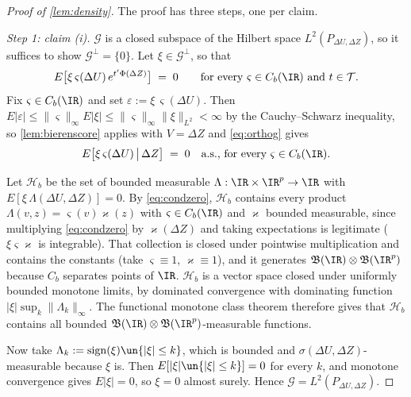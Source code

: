 \begin{proof}[Proof of \cref{lem:density}]
The proof has three steps, one per claim.

\emph{Step 1: claim (i).}
$\mathcal G$ is a closed subspace of the Hilbert space $L^{2}(P_{\Delta U,\Delta Z})$, so it suffices to
show $\mathcal G^{\perp}=\{0\}$. Let $\xi\in\mathcal G^{\perp}$, so that
\begin{equation}\label{eq:orthog}
E\big[\xi\,\varsigma(\Delta U)\,e^{t'\Phi(\Delta Z)}\big]\;=\;0
\qquad\text{for every }\varsigma\in C_b(\IR)\text{ and }t\in\mathcal T .
\end{equation}
Fix $\varsigma\in C_b(\IR)$ and set $\varepsilon:=\xi\,\varsigma(\Delta U)$. Then
$E|\varepsilon|\le\|\varsigma\|_\infty E|\xi|\le\|\varsigma\|_\infty\|\xi\|_{L^{2}}<\infty$ by the
Cauchy--Schwarz inequality, so \cref{lem:bierenscore} applies with $V=\Delta Z$ and \eqref{eq:orthog}
gives
\begin{equation}\label{eq:condzero}
E\big[\xi\,\varsigma(\Delta U)\,\big|\,\Delta Z\big]\;=\;0\quad\text{a.s., for every }\varsigma\in C_b(\IR).
\end{equation}

Let $\mathcal H_b$ be the set of bounded measurable $\Lambda:\IR\times\IR^{p}\to\IR$ with
$E[\xi\,\Lambda(\Delta U,\Delta Z)]=0$. By \eqref{eq:condzero}, $\mathcal H_b$ contains every product
$\Lambda(v,z)=\varsigma(v)\varkappa(z)$ with $\varsigma\in C_b(\IR)$ and $\varkappa$ bounded measurable, since
multiplying \eqref{eq:condzero} by $\varkappa(\Delta Z)$ and taking expectations is legitimate
($\xi\varsigma\varkappa$ is integrable). That collection is closed under pointwise multiplication and
contains the constants (take $\varsigma\equiv1$, $\varkappa\equiv1$), and it generates
$\mathfrak B(\IR)\otimes\mathfrak B(\IR^{p})$ because $C_b$ separates points of $\IR$. $\mathcal H_b$ is a
vector space closed under uniformly bounded monotone limits, by dominated convergence with dominating
function $|\xi|\sup_k\|\Lambda_k\|_\infty$. The functional monotone class theorem therefore gives that
$\mathcal H_b$ contains all bounded $\mathfrak B(\IR)\otimes\mathfrak B(\IR^{p})$-measurable functions.

Now take $\Lambda_k:=\operatorname{sign}(\xi)\un\{|\xi|\le k\}$, which is bounded and
$\sigma(\Delta U,\Delta Z)$-measurable because $\xi$ is. Then $E[|\xi|\un\{|\xi|\le k\}]=0$ for every
$k$, and monotone convergence gives $E|\xi|=0$, so $\xi=0$ almost surely. Hence
$\mathcal G=L^{2}(P_{\Delta U,\Delta Z})$.


\end{proof}

